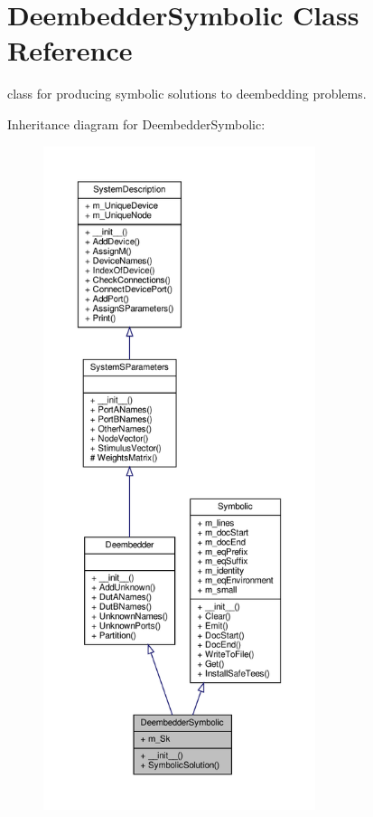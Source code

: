 \hypertarget{classSignalIntegrity_1_1SystemDescriptions_1_1DeembedderSymbolic_1_1DeembedderSymbolic}{}\section{Deembedder\+Symbolic Class Reference}
\label{classSignalIntegrity_1_1SystemDescriptions_1_1DeembedderSymbolic_1_1DeembedderSymbolic}


class for producing symbolic solutions to deembedding problems.  




Inheritance diagram for Deembedder\+Symbolic\+:
\nopagebreak
\begin{figure}[H]
\begin{center}
\leavevmode
\includegraphics[height=550pt]{classSignalIntegrity_1_1SystemDescriptions_1_1DeembedderSymbolic_1_1DeembedderSymbolic__inherit__graph}
\end{center}
\end{figure}


